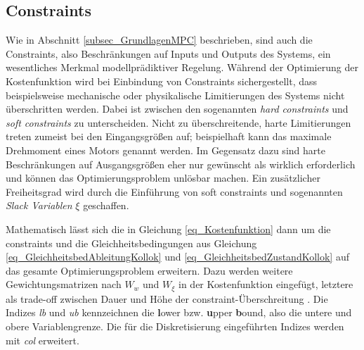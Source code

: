 \subsection{Constraints} \label{subsec_Constraints}
Wie in Abschnitt \ref{subsec_GrundlagenMPC} beschrieben, sind auch die Constraints, also Beschränkungen auf Inputs und Outputs des Systems, ein wesentliches Merkmal modellprädiktiver Regelung.
Während der Optimierung der Kostenfunktion wird bei Einbindung von Constraints sichergestellt, dass beispielsweise mechanische oder physikalische Limitierungen des Systems nicht überschritten werden.
Dabei ist zwischen den sogenannten \textit{hard constraints} und \textit{soft constraints} zu unterscheiden.
Nicht zu überschreitende, harte Limitierungen treten zumeist bei den Eingangsgrößen auf; beispielhaft kann das maximale Drehmoment eines Motors genannt werden.
Im Gegensatz dazu sind harte Beschränkungen auf Ausgangsgrößen eher nur gewünscht als wirklich erforderlich und können das Optimierungsproblem unlösbar machen.
Ein zusätzlicher Freiheitsgrad wird durch die Einführung von soft constraints und sogenannten \textit{Slack Variablen} $\xi$ geschaffen. \cite[S.4]{Schwenzer}

Mathematisch lässt sich die in Gleichung \ref{eq_Kostenfunktion} dann um die constraints und die Gleichheitsbedingungen aus Gleichung \ref{eq_GleichheitsbedAbleitungKollok} und \ref{eq_GleichheitsbedZustandKollok} auf das gesamte Optimierungsproblem erweitern.
Dazu werden weitere Gewichtungsmatrizen nach \cite[S.4]{Schwenzer} $W_w$ und $W_\xi$ in der Kostenfunktion eingefügt, letztere als trade-off zwischen Dauer und Höhe der constraint-Überschreitung \cite{Rawlings}.
Die Indizes \textit{lb} und \textit{ub} kennzeichnen die \textbf{l}ower bzw. \textbf{u}pper \textbf{b}ound, also die untere und obere Variablengrenze.
Die für die Diskretisierung eingeführten Indizes werden mit \textit{col} erweitert.

